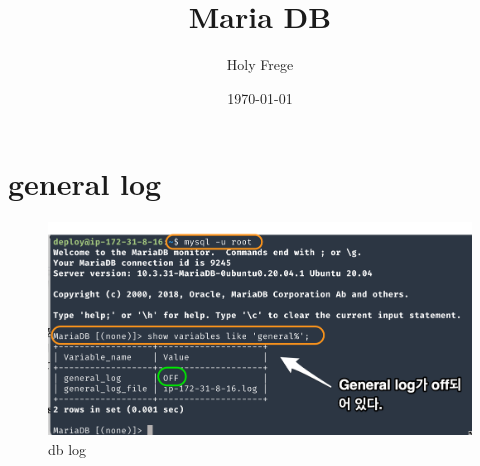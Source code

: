 \documentclass[11pt]{article}
\author{Holy Frege}
\date{\today}
\title{Maria DB}
\begin{document}
\maketitle
\tableofcontents

\section{general log}
\label{sec:org4c20815}
\begin{figure}[htbp]
\centering
\includegraphics[width=800px]{./img/db1.png}
\caption{\label{fig:orgb4f7c6b}db log}
\end{figure}
\end{document}
